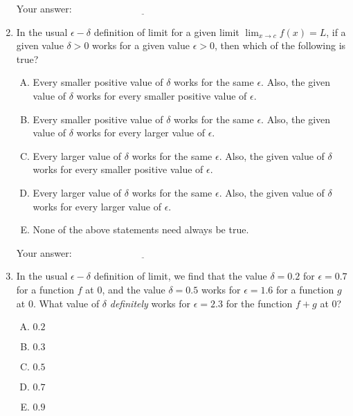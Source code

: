 \documentclass[10pt]{amsart}
\begin{document}
\begin{enumerate}
  \vspace{0.1in}
  Your answer: $\underline{\qquad\qquad\qquad\qquad\qquad\qquad\qquad}$
  \vspace{0.15in}

\item In the usual $\epsilon-\delta$ definition of limit for a given
  limit $\lim_{x \to c} f(x) = L$, if a given value $\delta > 0$ works
  for a given value $\epsilon > 0$, then which of the following is
  true?
  \begin{enumerate}[(A)]
  \item Every smaller positive value of $\delta$ works for the same
    $\epsilon$. Also, the given value of $\delta$ works for every
    smaller positive value of $\epsilon$.
  \item Every smaller positive value of $\delta$ works for the same
    $\epsilon$. Also, the given value of $\delta$ works for every
    larger value of $\epsilon$.
  \item Every larger value of $\delta$ works for the same
    $\epsilon$. Also, the given value of $\delta$ works for every
    smaller positive value of $\epsilon$.
  \item Every larger value of $\delta$ works for the same
    $\epsilon$. Also, the given value of $\delta$ works for every
    larger value of $\epsilon$.
  \item None of the above statements need always be true.
  \end{enumerate}

  \vspace{0.1in}
  Your answer: $\underline{\qquad\qquad\qquad\qquad\qquad\qquad\qquad}$
  \vspace{0.15in}

\item In the usual $\epsilon-\delta$ definition of limit, we find that
  the value $\delta = 0.2$ for $\epsilon = 0.7$ for a function $f$ at
  $0$, and the value $\delta = 0.5$ works for $\epsilon = 1.6$ for a
  function $g$ at $0$. What value of $\delta$ {\em definitely} works
  for $\epsilon = 2.3$ for the function $f + g$ at $0$?

  \begin{enumerate}[(A)]
  \item $0.2$
  \item $0.3$
  \item $0.5$
  \item $0.7$
  \item $0.9$
  \end{enumerate}


\end{enumerate}
\end{document}
